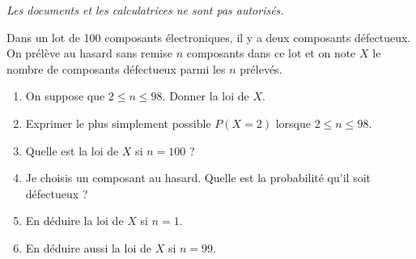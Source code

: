 \documentclass[12pt,reqno]{amsart}
\begin{document}
\ifsolutions\else
\textit{Les documents et les calculatrices ne sont pas autorisés.}
\vspace{7mm}
\fi

\bigskip

\begin{exo}
 Dans un lot de 100 composants électroniques, il y a deux composants d\'efectueux. On pr\'el\`eve au hasard sans remise $n$ composants dans ce lot et on note $X$ le nombre de composants d\'efectueux parmi les $n$ pr\'elev\'es.
\begin{enumerate}
\item On suppose que $2 \le n \le 98.$ Donner la loi de $X.$
 \item Exprimer le plus simplement possible  $P(X=2)$ lorsque $2 \le n \le 98.$
 \item Quelle est la loi de $X$ si $n=100$ ?
 \item Je choisis un composant au hasard. Quelle est la probabilit\'e qu'il soit d\'efectueux ?
 \item En d\'eduire la loi de $X$ si $n=1.$
 \item En d\'eduire aussi la loi de $X$ si $n=99.$
\end{enumerate}
 
 
\end{exo}
\end{document}
